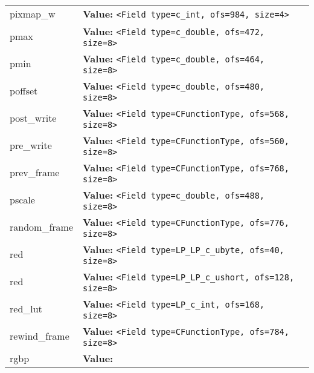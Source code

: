 \begin{longtable}{|p{\varnamewidth}|p{\vardescrwidth}|l}
\cline{1-2}
\raggedright p\-i\-x\-m\-a\-p\-\_\-w\- & \raggedright \textbf{Value:} 
{\tt {\textless}Field type=c\_int, ofs=984, size=4{\textgreater}}&\\
\cline{1-2}
\raggedright p\-m\-a\-x\- & \raggedright \textbf{Value:} 
{\tt {\textless}Field type=c\_double, ofs=472, size=8{\textgreater}}&\\
\cline{1-2}
\raggedright p\-m\-i\-n\- & \raggedright \textbf{Value:} 
{\tt {\textless}Field type=c\_double, ofs=464, size=8{\textgreater}}&\\
\cline{1-2}
\raggedright p\-o\-f\-f\-s\-e\-t\- & \raggedright \textbf{Value:} 
{\tt {\textless}Field type=c\_double, ofs=480, size=8{\textgreater}}&\\
\cline{1-2}
\raggedright p\-o\-s\-t\-\_\-w\-r\-i\-t\-e\- & \raggedright \textbf{Value:} 
{\tt {\textless}Field type=CFunctionType, ofs=568, size=8{\textgreater}}&\\
\cline{1-2}
\raggedright p\-r\-e\-\_\-w\-r\-i\-t\-e\- & \raggedright \textbf{Value:} 
{\tt {\textless}Field type=CFunctionType, ofs=560, size=8{\textgreater}}&\\
\cline{1-2}
\raggedright p\-r\-e\-v\-\_\-f\-r\-a\-m\-e\- & \raggedright \textbf{Value:} 
{\tt {\textless}Field type=CFunctionType, ofs=768, size=8{\textgreater}}&\\
\cline{1-2}
\raggedright p\-s\-c\-a\-l\-e\- & \raggedright \textbf{Value:} 
{\tt {\textless}Field type=c\_double, ofs=488, size=8{\textgreater}}&\\
\cline{1-2}
\raggedright r\-a\-n\-d\-o\-m\-\_\-f\-r\-a\-m\-e\- & \raggedright \textbf{Value:} 
{\tt {\textless}Field type=CFunctionType, ofs=776, size=8{\textgreater}}&\\
\cline{1-2}
\raggedright r\-e\-d\- & \raggedright \textbf{Value:} 
{\tt {\textless}Field type=LP\_LP\_c\_ubyte, ofs=40, size=8{\textgreater}}&\\
\cline{1-2}
\raggedright r\-e\-d\-1\-6\- & \raggedright \textbf{Value:} 
{\tt {\textless}Field type=LP\_LP\_c\_ushort, ofs=128, size=8{\textgreater}}&\\
\cline{1-2}
\raggedright r\-e\-d\-\_\-l\-u\-t\- & \raggedright \textbf{Value:} 
{\tt {\textless}Field type=LP\_c\_int, ofs=168, size=8{\textgreater}}&\\
\cline{1-2}
\raggedright r\-e\-w\-i\-n\-d\-\_\-f\-r\-a\-m\-e\- & \raggedright \textbf{Value:} 
{\tt {\textless}Field type=CFunctionType, ofs=784, size=8{\textgreater}}&\\
\cline{1-2}
\raggedright r\-g\-b\-2\-p\- & \raggedright \textbf{Value:} 

\end{longtable}
